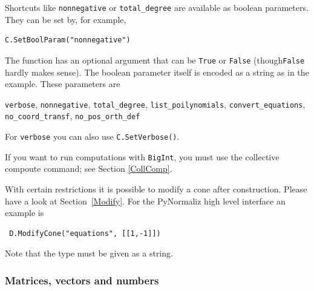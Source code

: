 \begin{small}
Shortcuts like \verb|nonnegative| or \verb|total_degree| are available as boolean parameters. They can be set by, for example,
\begin{Verbatim}
C.SetBoolParam("nonnegative")
\end{Verbatim}
The function has an optional argument that can be \verb*|True| or \verb*|False| (though\verb*|False| hardly makes sense). The boolean parameter itself is encoded as a string as in the example. These parameters are
\begin{center}
	\verb*|verbose|, \verb*|nonnegative|, \verb*|total_degree|, \verb*|list_poilynomials|, \verb*|convert_equations|, \verb*|no_coord_transf|, \verb*|no_pos_orth_def|
\end{center}
For \verb*|verbose| you can also use \verb*|C.SetVerbose()|.

If you want to run computations with \verb*|BigInt|, you must use the collective compoute command; see Section \ref{CollComp}. 

With certain restrictions it is possible to modify a cone after construction. Please have a look at Section~\ref{Modify}. For the PyNormaliz high level interface an example is
\begin{Verbatim} 
 D.ModifyCone("equations", [[1,-1]])
\end{Verbatim}
Note that the type must be given as a string.

\subsubsection{Matrices, vectors and numbers}


\end{small}
